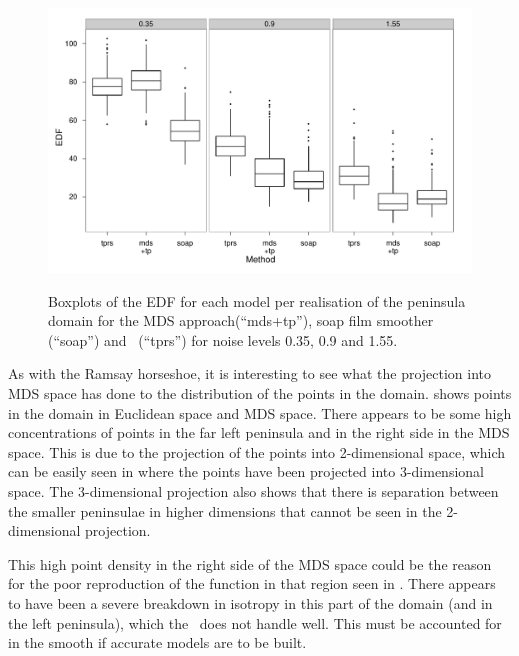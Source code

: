 \begin{figure}
\centering
\includegraphics[width=\textwidth]{mds/figs/mds-wt2-boxplot-edf.pdf} \\
\caption{Boxplots of the EDF for each model per realisation of the peninsula domain for the MDS approach(``mds+tp''), soap film smoother (``soap'') and \tprs\ (``tprs'') for noise levels 0.35, 0.9 and 1.55.}
\label{mds-wt2-boxplot-edf}
\end{figure}

As with the Ramsay horseshoe, it is interesting to see what the projection into MDS space has done to the distribution of the points in the domain.  shows points in the domain in Euclidean space and MDS space. There appears to be some high concentrations of points in the far left peninsula and in the right side in the MDS space. This is due to the projection of the points into 2-dimensional space, which can be easily seen in  where the points have been projected into 3-dimensional space. The 3-dimensional projection also shows that there is separation between the smaller peninsulae in higher dimensions that cannot be seen in the 2-dimensional projection.

This high point density in the right side of the MDS space could be the reason for the poor reproduction of the function in that region seen in . There appears to have been a severe breakdown in isotropy in this part of the domain (and in the left peninsula), which the \tprs\ does not handle well. This must be accounted for in the smooth if accurate models are to be built.

